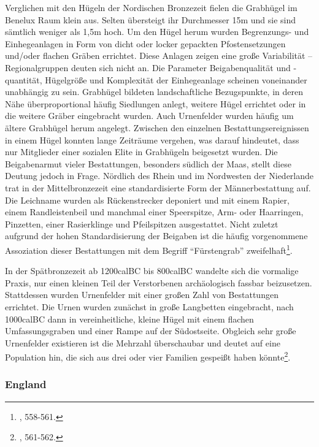 \documentclass[openany,twoside,twocolumn]{book}
\let\rmarkdownfootnote\footnote%
\def\footnote{\protect\rmarkdownfootnote}
\begin{document}
Verglichen mit den Hügeln der Nordischen Bronzezeit fielen die Grabhügel
im Benelux Raum klein aus. Selten übersteigt ihr Durchmesser 15m und sie
sind sämtlich weniger als 1,5m hoch. Um den Hügel herum wurden
Begrenzungs- und Einhegeanlagen in Form von dicht oder locker gepackten
Pfostensetzungen und/oder flachen Gräben errichtet. Diese Anlagen zeigen
eine große Variabilität -- Regionalgruppen deuten sich nicht an. Die
Parameter Beigabenqualität und -quantität, Hügelgröße und Komplexität
der Einhegeanlage scheinen voneinander unabhängig zu sein. Grabhügel
bildeten landschaftliche Bezugspunkte, in deren Nähe überproportional
häufig Siedlungen anlegt, weitere Hügel errichtet oder in die weitere
Gräber eingebracht wurden. Auch Urnenfelder wurden häufig um ältere
Grabhügel herum angelegt. Zwischen den einzelnen Bestattungsereignissen
in einem Hügel konnten lange Zeiträume vergehen, was darauf hindeutet,
dass nur Mitglieder einer sozialen Elite in Grabhügeln beigesetzt
wurden. Die Beigabenarmut vieler Bestattungen, besonders südlich der
Maas, stellt diese Deutung jedoch in Frage. Nördlich des Rhein und im
Nordwesten der Niederlande trat in der Mittelbronzezeit eine
standardisierte Form der Männerbestattung auf. Die Leichname wurden als
Rückenstrecker deponiert und mit einem Rapier, einem Randleistenbeil und
manchmal einer Speerspitze, Arm- oder Haarringen, Pinzetten, einer
Rasierklinge und Pfeilspitzen ausgestattet. Nicht zuletzt aufgrund der
hohen Standardisierung der Beigaben ist die häufig vorgenommene
Assoziation dieser Bestattungen mit dem Begriff ``Fürstengrab''
zweifelhaft\footnote{\textcite{fokkens_bronze_2013}, 558-561.}.

In der Spätbronzezeit ab 1200calBC bis 800calBC wandelte sich die
vormalige Praxis, nur einen kleinen Teil der Verstorbenen archäologisch
fassbar beizusetzen. Stattdessen wurden Urnenfelder mit einer großen
Zahl von Bestattungen errichtet. Die Urnen wurden zunächst in große
Langbetten eingebracht, nach 1000calBC dann in vereinheitliche, kleine
Hügel mit einem flachen Umfassungsgraben und einer Rampe auf der
Südostseite. Obgleich sehr große Urnenfelder existieren ist die Mehrzahl
überschaubar und deutet auf eine Population hin, die sich aus drei oder
vier Familien gespeißt haben könnte\footnote{\textcite{fokkens_bronze_2013},
  561-562.}.

\hypertarget{england}{%
\subsubsection{England}\label{england}}
\end{document}

